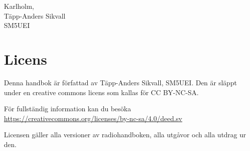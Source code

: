 \noindent Karlholm, \DokumentDatum\\
Täpp-Anders Sikvall\\
	SM5UEI

\vspace{\fill}

\section*{Licens}

Denna handbok är författad av Täpp-Anders Sikvall, SM5UEI. Den är
släppt under en creative commons licens som kallas för CC BY-NC-SA.


För fullständig information kan du besöka\\
\url{https://creativecommons.org/licenses/by-nc-sa/4.0/deed.sv}

Licensen gäller alla versioner av radiohandboken, alla utgåvor och
alla utdrag ur den.
